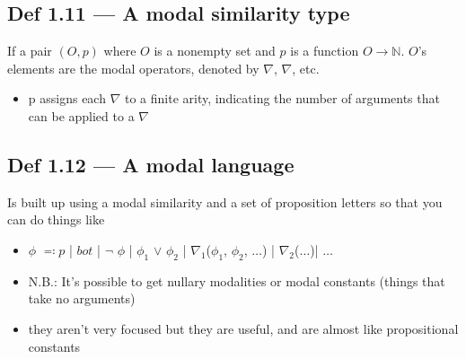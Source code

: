 \documentclass[10pt, a4paper, twoside]{article}
\begin{document}
\subsection{Def 1.11 --- A modal similarity type}
If a pair $(O, p)$ where $O$ is a nonempty set and $p$ is a function $O \rightarrow \mathbb{N}$. $O$'s elements are the modal operators, denoted by $\nabla$, $\nabla$, etc.
\begin{itemize}
  \item p assigns each $\nabla$ to a finite arity, indicating the number of arguments that can be applied to a $\nabla$
\end{itemize}
\subsection{Def 1.12 --- A modal language}
Is built up using a modal similarity and a set of proposition letters so that you can do things like
\begin{itemize}
  \item $\phi$ $\eqqcolon p$ | $bot$ | $\neg$ $\phi$ | $\phi_1$ $\lor$ $\phi_2$ | $\nabla_1$($\phi_1$, $\phi_2$, $\ldots$) | $\nabla_2$($\ldots$)| $\ldots$
  \item N.B.: It’s possible to get nullary modalities or modal constants (things
      that take no arguments)
  \item they aren’t very focused but they are useful, and are almost like
  propositional constants
\end{itemize}
\end{document}
